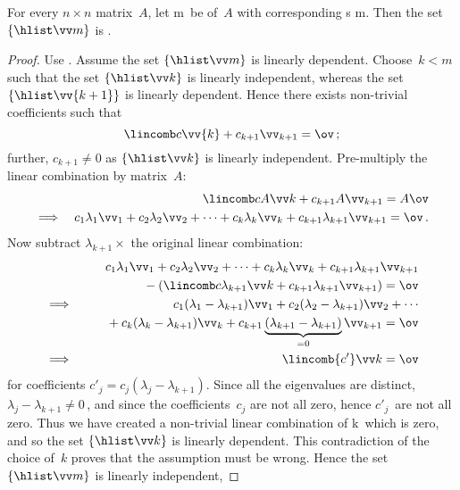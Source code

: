 \begin{theorem} \label{thm:indepev}
For every \(n\times n\) matrix~\(A\), let \hlist\lambda m\ be  of~\(A\) with corresponding s \hlist\vv m.
Then the set \(\{\hlist \vv m\}\) is .
\end{theorem}
\begin{proof} 
Use .
Assume the set \(\{\hlist \vv m\}\) is linearly dependent.
Choose~\(k<m\) such that the set \(\{\hlist\vv k\}\) is linearly independent, whereas the set \(\{\hlist\vv{k+1}\}\) is linearly dependent.
Hence there exists non-trivial coefficients such that 
\begin{equation*}
\lincomb c\vv{k}+c_{k+1}\vv_{k+1}=\ov\,;
\end{equation*}
further, \(c_{k+1}\neq0\) as \(\{\hlist\vv k\}\) is linearly independent.
Pre-multiply the linear combination by matrix~\(A\):
\begin{eqnarray*}&&
\lincomb c{A\vv}k+c_{k+1}A\vv_{k+1}=A\ov
\\\implies&&
c_1\lambda_1\vv_1+c_2\lambda_2\vv_2+\cdots+c_k\lambda_k\vv_k+c_{k+1}\lambda_{k+1}\vv_{k+1}=\ov\,.
\end{eqnarray*}
Now subtract \(\lambda_{k+1}\times\) the original linear combination:
\begin{eqnarray*}&&
\phantom{{}+(}c_1\lambda_1\vv_1+c_2\lambda_2\vv_2+\cdots+c_k\lambda_k\vv_k+c_{k+1}\lambda_{k+1}\vv_{k+1}
\\&&{}
-\left(\lincomb c{\lambda_{k+1}\vv}{k}
+c_{k+1}\lambda_{k+1}\vv_{k+1}\right)=\ov
\\\implies&&
c_1(\lambda_1-\lambda_{k+1})\vv_1+c_2(\lambda_2-\lambda_{k+1})\vv_2+\cdots
\\&&{}
+c_k(\lambda_k-\lambda_{k+1})\vv_k
+c_{k+1}\underbrace{(\lambda_{k+1}-\lambda_{k+1})}_{=0}\vv_{k+1}=\ov
\\\implies&&
\lincomb{c'}\vv k=\ov
\end{eqnarray*}
for coefficients \(c'_j=c_j(\lambda_j-\lambda_{k+1})\).
Since all the eigenvalues are distinct, \(\lambda_j-\lambda_{k+1}\neq0\)\,, and since the coefficients~\(c_j\) are not all zero, hence \(c'_j\)~are not all zero.
Thus we have created a non-trivial linear combination of \hlist \vv k\ which is zero, and so the set \(\{\hlist\vv k\}\) is linearly dependent.
This contradiction of the choice of~\(k\) proves that the assumption must be wrong.
Hence the set \(\{\hlist \vv m\}\) is linearly independent, 
\end{proof}



